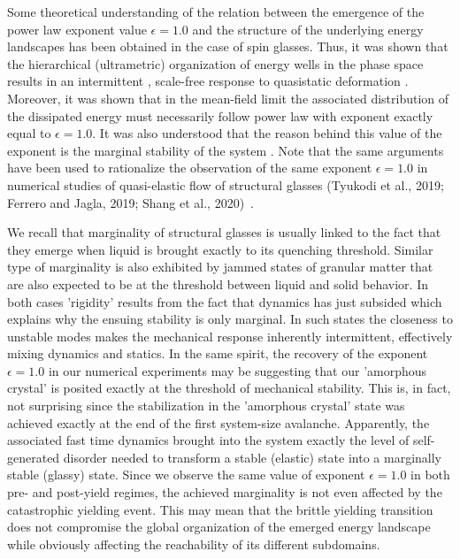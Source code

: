 \documentclass[aps,
superscriptaddress,notitlepage]{revtex4-1}
\begin{document}
Some  theoretical understanding of  the relation between the emergence of the power law exponent value $\epsilon = 1.0$ and the structure of the underlying energy  landscapes has been  obtained  in the case of  spin glasses. Thus,  it was shown  
that the hierarchical (ultrametric) organization of energy wells in the phase space results in an intermittent , scale-free response to quasistatic deformation \cite{Franz2017-fa,Muller2015,Berthier2019-dm,Dennis2020-jb}. Moreover, it was  shown that  in the mean-field limit the   associated distribution of  the dissipated energy  must necessarily follow power law with exponent  exactly  equal to $\epsilon = 1.0$.  It was also understood that the reason behind  this value of the exponent  is the  marginal stability of the system  \cite{Franz2017-fa,Pazmandi1999-lb,Le-Doussal2012-kv}. Note that the same arguments have been used to rationalize the observation  of  the same exponent $\epsilon = 1.0$ in numerical studies of quasi-elastic flow of structural glasses (Tyukodi et al., 2019; Ferrero and Jagla, 2019; Shang et al., 2020)~\cite{tyukodi2019avalanches,Ferrero2019-rx,Shang2020}.

We recall that  marginality of structural glasses is usually linked to the fact that they emerge  when liquid  is brought exactly to its  quenching threshold.  Similar type of marginality is also exhibited by  jammed states of granular matter that are also expected  to be at the threshold between liquid and solid behavior. In both cases  'rigidity'  results from  the fact that  dynamics has just subsided which explains why the ensuing stability is only marginal. In such states the closeness to unstable   modes makes the mechanical response   inherently intermittent, effectively mixing dynamics and statics. In the same  spirit, the recovery of  the exponent $\epsilon = 1.0$ in our numerical experiments may be suggesting that our 'amorphous crystal' is posited exactly at the threshold of mechanical stability. This is, in fact, not surprising  since the stabilization in the 'amorphous crystal' state was achieved exactly at the end of the first system-size avalanche.  Apparently, the associated  fast time dynamics  brought into the system  exactly the   level of self-generated  disorder needed  to transform  a stable (elastic) state into a marginally stable (glassy) state. Since we observe the same value of exponent $\epsilon = 1.0$ in both pre- and post-yield regimes, the achieved marginality is not even affected by the catastrophic  yielding event. This may mean that   the brittle  yielding transition does not compromise   the global organization of the emerged energy landscape while obviously  affecting the reachability of its different subdomains.
\end{document}
